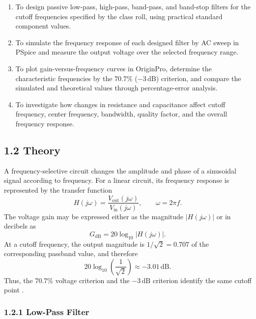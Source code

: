 \documentclass[12pt,a4paper]{article}
\begin{document}
\begin{enumerate}[label=\roman*.,leftmargin=0.75cm,itemsep=0.25em]
  \item To design passive low-pass, high-pass, band-pass, and band-stop filters for the cutoff frequencies specified by the class roll, using practical standard component values.
  \item To simulate the frequency response of each designed filter by AC sweep in PSpice and measure the output voltage over the selected frequency range.
  \item To plot gain-versus-frequency curves in OriginPro, determine the characteristic frequencies by the 70.7\% ($-3\,\mathrm{dB}$) criterion, and compare the simulated and theoretical values through percentage-error analysis.
  \item To investigate how changes in resistance and capacitance affect cutoff frequency, center frequency, bandwidth, quality factor, and the overall frequency response.
\end{enumerate}

\subsection*{1.2 Theory}

A frequency-selective circuit changes the amplitude and phase of a sinusoidal signal according to frequency. For a linear circuit, its frequency response is represented by the transfer function
\begin{equation}
  H(j\omega)=\frac{V_{\mathrm{out}}(j\omega)}{V_{\mathrm{in}}(j\omega)},
  \qquad \omega=2\pi f .
  \label{eq:transfer-general}
\end{equation}
The voltage gain may be expressed either as the magnitude $|H(j\omega)|$ or in decibels as
\begin{equation}
  G_{\mathrm{dB}}=20\log_{10}|H(j\omega)| .
  \label{eq:gain-db}
\end{equation}
At a cutoff frequency, the output magnitude is $1/\sqrt{2}=0.707$ of the corresponding passband value, and therefore
\begin{equation}
  20\log_{10}\left(\frac{1}{\sqrt{2}}\right)\approx-3.01\,\mathrm{dB}.
  \label{eq:cutoff-db}
\end{equation}
Thus, the 70.7\% voltage criterion and the $-3\,\mathrm{dB}$ criterion identify the same cutoff point \cite{alexander2013}\cite{boylestad2007}.

\subsubsection*{1.2.1 Low-Pass Filter}
\end{document}
